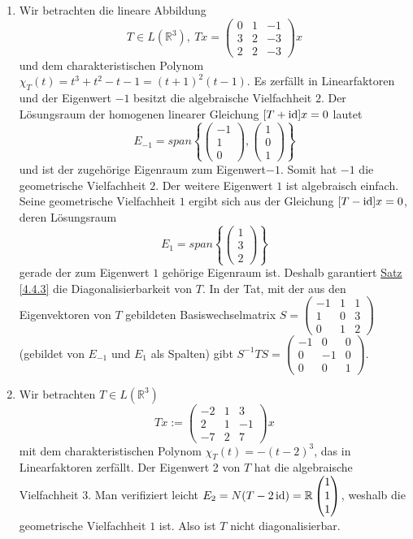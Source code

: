 \begin{enumerate}
\item Wir betrachten die lineare Abbildung 
\[T\in L(\mathbb{R}^3),\ Tx=\begin{pmatrix}0 & 1 & -1\\ 3 & 2 & -3 \\ 2 & 2 & -3\end{pmatrix}x\]
und dem charakteristischen Polynom $\chi _T(t)=t^3+t^2-t-1=(t+1)^2(t-1)$.  Es zerfällt in Linearfaktoren und der Eigenwert $-1$ besitzt die algebraische Vielfachheit $2$.  Der Lösungsraum der homogenen linearer Gleichung $[T+\operatorname{id}]x=0$ lautet
\[E_{-1}=span\left\{\begin{pmatrix}-1\\ 1\\ 0\end{pmatrix},\begin{pmatrix}1\\ 0\\ 1\end{pmatrix}\right\}\]
und ist der zugehörige Eigenraum zum Eigenwert$-1$.  Somit hat $-1$ die geometrische Vielfachheit $2$.  Der weitere Eigenwert $1$ ist algebraisch einfach.  Seine geometrische Vielfachheit $1$ ergibt sich aus der Gleichung $[T-\operatorname{id}]x=0$, deren Lösungsraum
\[E_1=span\left\{\begin{pmatrix}1\\ 3\\ 2\end{pmatrix}\right\}\]
gerade der zum Eigenwert $1$ gehörige Eigenraum ist.  Deshalb garantiert \hyperref[4.4.3]{Satz \ref{4.4.3}} die Diagonalisierbarkeit von $T$.  In der Tat, mit der aus den Eigenvektoren von $T$ gebildeten Basiswechselmatrix $S=\begin{pmatrix}-1 & 1 & 1\\ 1 & 0 & 3 \\ 0 & 1 & 2\end{pmatrix}$ (gebildet von $E_{-1}$ und $E_1$ als Spalten) gibt $S^{-1}TS=\begin{pmatrix}-1 & 0 & 0 \\0 & -1 & 0\\ 0 & 0 & 1\end{pmatrix}$.
\item Wir betrachten $T\in L(\mathbb{R}^3)$
\[Tx:=\begin{pmatrix}-2 & 1 & 3\\ 2 & 1 & -1\\ -7 & 2 & 7\end{pmatrix}x\]
mit dem charakteristischen Polynom $\chi _T(t)=-(t-2)^3$, das in Linearfaktoren zerfällt.  Der Eigenwert 2 von $T$ hat die algebraische Vielfachheit $3$.  Man verifiziert leicht $E_2=N(T-2\operatorname{id})=\mathbb{R}\begin{pmatrix}1\\ 1\\ 1\end{pmatrix}$,
weshalb die geometrische Vielfachheit $1$ ist.  Also ist $T$ nicht diagonalisierbar.
\end{enumerate}
